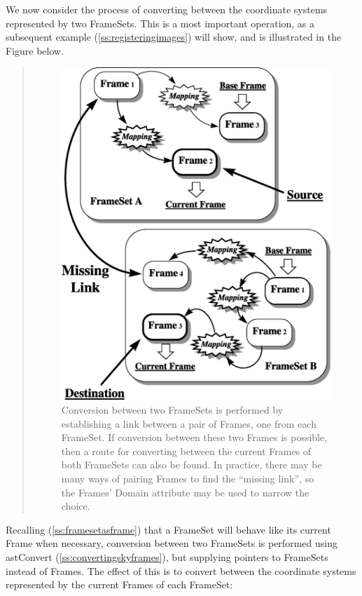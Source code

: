 \documentclass[twoside,11pt]{article}
\newcommand{\htmlref}[2]{#1}
\newcommand{\secref}[1]{\S\ref{#1}}
\renewcommand{\secref}[1]{\ref{#1}}
\begin{document}
\begin{htmlonly}
   We now consider the process of converting between the coordinate
   systems represented by two FrameSets. This is a most important
   operation, as a subsequent example (\secref{ss:registeringimages})
   will show, and is illustrated in the Figure below.
   \begin{quote}
   \begin{figure}
   \label{fig:fsconvert}
   \includegraphics[scale=1.0]{sun211_figures/fsalign.eps}
   \caption{Conversion between two FrameSets is performed by establishing
   a link between a pair of Frames, one from each FrameSet. If conversion
   between these two Frames is possible, then a route for converting
   between the current Frames of both FrameSets can also be found. In
   practice, there may be many ways of pairing Frames to find the
   ``missing link'', so the Frames' Domain attribute may be used to
   narrow the choice.}
   \end{figure}
   \end{quote}
\end{htmlonly}
Recalling (\secref{ss:framesetasframe}) that a FrameSet will behave
like its current \htmlref{Frame}{Frame} when necessary, conversion between two
FrameSets is performed using \htmlref{astConvert}{astConvert}
(\secref{ss:convertingskyframes}), but supplying pointers to FrameSets
instead of Frames. The effect of this is to convert between the
coordinate systems represented by the current Frames of each FrameSet:
\end{document}
